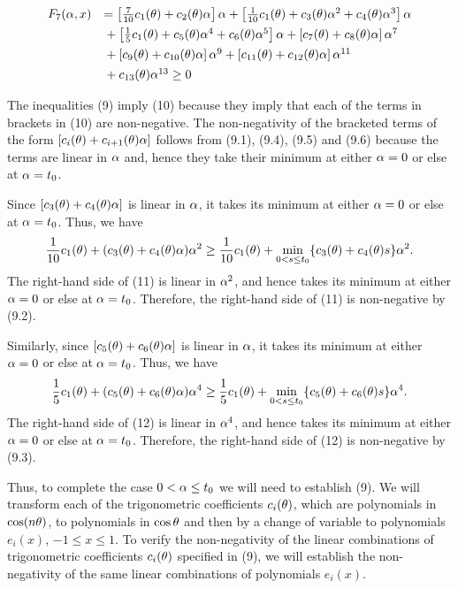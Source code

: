 \setcounter{equation}{9}

\begin{equation}
\label{10}
\begin{array}{ll} F_7(\alpha,x) 
& =\left[\frac{7}{10} c_1(\theta)+c_2(\theta)\alpha\right]
\alpha+\left[\frac{1}{10}c_1(\theta)+c_3(\theta)\alpha^2+c_4(\theta)\alpha^3 \right]\alpha\\[1ex]
& \mbox{} + \left[\frac{1}{5}c_1(\theta)+c_5(\theta)\alpha^4+c_6(\theta)\alpha^5\right]
\alpha+\left[c_7(\theta)+c_8(\theta)\alpha\right]\alpha^7\\[1ex] 
& \mbox{} + \left[c_9(\theta)+c_{10}(\theta)\alpha\right]\alpha^9+
\left[c_{11}(\theta)+c_{12}(\theta)\alpha\right]\alpha^{11}\\[1ex] 
& \mbox{} + c_{13}(\theta)\alpha^{13}\geq 0\end{array}
\end{equation}

The inequalities (9) imply (10) because they imply that each of the
terms in brackets in (10) are non-negative.  The non-negativity of
the bracketed terms of the form $[c_i(\theta)+c_{i+1}(\theta)\alpha]$ follows
from (9.1), (9.4), (9.5) and (9.6) because the terms are linear in
$\alpha$ and, hence they take their minimum at either $\alpha=0$ or else at
$\alpha=t_0$.

Since $[c_3(\theta)+c_4(\theta)\alpha]$ is linear in $\alpha$, it takes its minimum
at either $\alpha=0$ or else at $\alpha=t_0$.  Thus, we have
\begin{equation}
\label{11}
\frac{1}{10} c_1(\theta) + (c_3(\theta)+c_4(\theta)\alpha) \alpha^2 \geq \frac{1}{10}
c_1(\theta) + \min_{0<s\leq t_0} \{c_3(\theta)+c_4(\theta)s\} \alpha^2.
\end{equation}
The right-hand side of (11) is linear in $\alpha^2$, and hence takes its
minimum at either $\alpha=0$ or else at $\alpha=t_0$.  Therefore, the
right-hand side of (11) is non-negative by (9.2).

Similarly, since $[c_5(\theta)+c_6(\theta)\alpha]$ is linear in $\alpha$, it takes
its minimum at either $\alpha=0$ or else at $\alpha=t_0$.  Thus, we have 
\begin{equation}
\label{12}
\frac{1}{5} c_1(\theta) + (c_5(\theta)+c_6(\theta)\alpha) \alpha^4 \geq \frac{1}{5}
c_1(\theta) + \min_{0<s\leq t_0} \{c_5(\theta)+c_6(\theta)s\} \alpha^4.
\end{equation}
The right-hand side of (12) is linear in $\alpha^4$, and hence takes its
minimum at either $\alpha=0$ or else at $\alpha=t_0$.  Therefore, the
right-hand side of (12) is non-negative by (9.3).

Thus, to complete the case $0<\alpha\leq t_0$ we will need to establish
(9).  We will transform each of the trigonometric coefficients
$c_i(\theta)$, which are polynomials in $\cos(n\theta)$, to polynomials in
$\cos\theta$ and then by a change of variable to polynomials $e_i(x)$,
$-1\leq x\leq 1$.  To verify the non-negativity of the linear
combinations of trigonometric coefficients $c_i(\theta)$ specified in
(9), we will establish the non-negativity of the same linear
combinations of polynomials $e_i(x)$.

